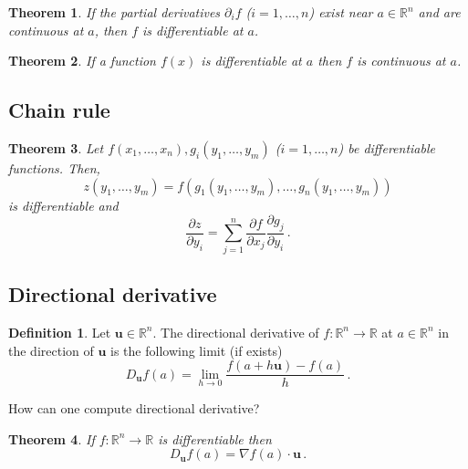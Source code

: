\documentclass[
]{article}
\newtheorem{theorem}{Theorem}[section]
\theoremstyle{definition}
\newtheorem{definition}{Definition}[section]
\theoremstyle{definition}
\theoremstyle{definition}
\theoremstyle{definition}
\theoremstyle{remark}
\begin{document}
\begin{theorem}
If the partial derivatives \(\partial_i f\) (\(i= 1, \dots, n\)) exist near \(a\in \mathbb{R}^n\) and are continuous
at \(a\), then \(f\) is differentiable at \(a\).
\end{theorem}

\begin{theorem}
If a function \(f(x)\) is differentiable at \(a\) then \(f\) is continuous at \(a\).
\end{theorem}

\hypertarget{chain-rule}{%
\subsection{Chain rule}\label{chain-rule}}

\begin{theorem}
Let \(f(x_1,\dots, x_n), g_i(y_1,\dots, y_m)\) (\(i = 1,\dots, n\)) be
differentiable
functions.
Then,
\[z(y_1, \dots, y_m) = f(g_1(y_1, \dots, y_m), \dots, g_n(y_1, \dots, y_m))\]
is differentiable and
\begin{equation*}
    \frac{\partial z}{\partial y_i} = \sum_{j=1}^n \frac{\partial f}{\partial x_j} \frac{\partial g_j}{\partial y_i} \,.
\end{equation*}
\end{theorem}

\hypertarget{directional-derivative}{%
\subsection{Directional derivative}\label{directional-derivative}}

\begin{definition}
Let \(\mathbf{u} \in \mathbb{R}^n\). The directional derivative of \(f:\mathbb{R}^n \to \mathbb{R}\) at \(a\in \mathbb{R}^n\)
in the direction of \(\mathbf{u}\) is the following limit (if exists)
\begin{equation*}
    D_{\mathbf{u}} f(a) = \lim_{h \to 0} \frac{ f( a + h \mathbf{u}) - f(a)}{h}\,.
\end{equation*}
\end{definition}

How can one compute directional derivative?

\begin{theorem}
If \(f:\mathbb{R}^n \to \mathbb{R}\) is differentiable then
\begin{equation*}
    D_{\mathbf{u}} f(a) = \nabla f(a) \cdot \mathbf{u} \,.
\end{equation*}
\end{theorem}
\end{document}
